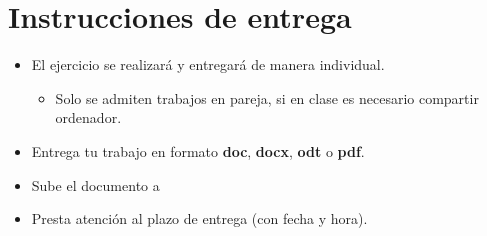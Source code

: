 \section{Instrucciones de entrega}
\begin{itemize}
\item El ejercicio se realizará y entregará de manera individual.
  \begin{itemize}
  \item Solo se admiten trabajos en pareja, si en clase es necesario compartir ordenador.
  \end{itemize}
\item Entrega tu trabajo en formato \textbf{doc}, \textbf{docx}, \textbf{odt} o \textbf{pdf}.
\item Sube el documento a 
\item Presta atención al plazo de entrega (con fecha y hora).
  
\end{itemize}

